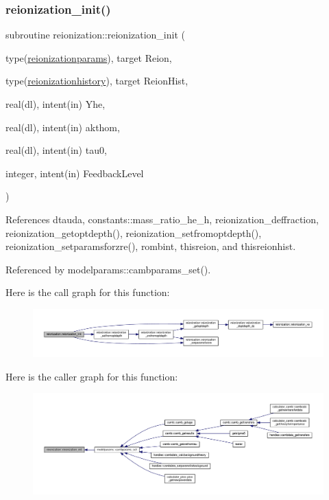 \subsubsection{\texorpdfstring{reionization\+\_\+init()}{reionization\_init()}}
{\footnotesize\ttfamily subroutine reionization\+::reionization\+\_\+init (\begin{DoxyParamCaption}\item[{type(\mbox{\hyperlink{structreionization_1_1reionizationparams}{reionizationparams}}), target}]{Reion,  }\item[{type(\mbox{\hyperlink{structreionization_1_1reionizationhistory}{reionizationhistory}}), target}]{Reion\+Hist,  }\item[{real(dl), intent(in)}]{Yhe,  }\item[{real(dl), intent(in)}]{akthom,  }\item[{real(dl), intent(in)}]{tau0,  }\item[{integer, intent(in)}]{Feedback\+Level }\end{DoxyParamCaption})}



References dtauda, constants\+::mass\+\_\+ratio\+\_\+he\+\_\+h, reionization\+\_\+deffraction, reionization\+\_\+getoptdepth(), reionization\+\_\+setfromoptdepth(), reionization\+\_\+setparamsforzre(), rombint, thisreion, and thisreionhist.



Referenced by modelparams\+::cambparams\+\_\+set().

Here is the call graph for this function\+:
\nopagebreak
\begin{figure}[H]
\begin{center}
\leavevmode
\includegraphics[width=350pt]{namespacereionization_a59dc84ce6904020903bfc0ae6f864a27_cgraph}
\end{center}
\end{figure}
Here is the caller graph for this function\+:
\nopagebreak
\begin{figure}[H]
\begin{center}
\leavevmode
\includegraphics[width=350pt]{namespacereionization_a59dc84ce6904020903bfc0ae6f864a27_icgraph}
\end{center}
\end{figure}
\mbox{\label{namespacereionization_a8d8a4a4fcaa0e1adc50de9a45143d2f8}} 
